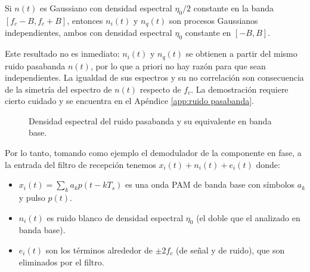 \begin{proposicion}\label{prop:ruido demodulado}
    Si $n(t)$ es Gaussiano con densidad espectral $\eta_0/2$ constante en la banda $[f_c-B,f_c+B]$, entonces $n_i(t)$ y $n_q(t)$ son procesos Gaussianos independientes, ambos con densidad espectral $\eta_0$ constante en $[-B,B]$.
\end{proposicion}
Este resultado no es inmediato: $n_i(t)$ y $n_q(t)$ se obtienen a partir del mismo ruido pasabanda $n(t)$, por lo que a priori no hay razón para que sean independientes. La igualdad de sus espectros y su no correlación son consecuencia de la simetría del espectro de $n(t)$ respecto de $f_c$. La demostración requiere cierto cuidado y se encuentra en el Apéndice \ref{app:ruido pasabanda}.


\begin{figure}
    \begin{center}
    \end{center}
    \caption{Densidad espectral del ruido pasabanda y su equivalente en banda base.}\label{fig:ruido pasabanda}
\end{figure}

Por lo tanto, tomando como ejemplo el demodulador de la componente en fase, a la entrada del filtro de recepción tenemos $x_i(t)+n_i(t)+e_i(t)$ donde:
\begin{itemize}
    \item $x_i(t) = \sum_k a_k p(t-kT_s)$ es una onda PAM de banda base con símbolos $a_k$ y pulso $p(t)$.
    \item $n_i(t)$ es ruido blanco de densidad espectral $\eta_0$ (el doble que el analizado en banda base).
    \item $e_i(t)$ son los términos alrededor de $\pm 2f_c$ (de señal y de ruido), que son eliminados por el filtro.
\end{itemize}

